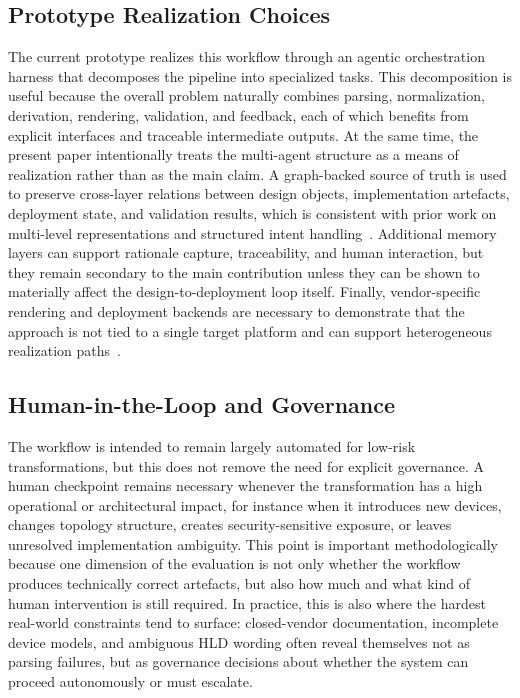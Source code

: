 \documentclass[conference]{IEEEtran}
\begin{document}
\subsection{Prototype Realization Choices}

The current prototype realizes this workflow through an agentic orchestration harness that decomposes the pipeline into specialized tasks. This decomposition is useful because the overall problem naturally combines parsing, normalization, derivation, rendering, validation, and feedback, each of which benefits from explicit interfaces and traceable intermediate outputs. At the same time, the present paper intentionally treats the multi-agent structure as a means of realization rather than as the main claim. A graph-backed source of truth is used to preserve cross-layer relations between design objects, implementation artefacts, deployment state, and validation results, which is consistent with prior work on multi-level representations and structured intent handling~\cite{jeffreyMALT20,paul2025swift}. Additional memory layers can support rationale capture, traceability, and human interaction, but they remain secondary to the main contribution unless they can be shown to materially affect the design-to-deployment loop itself. Finally, vendor-specific rendering and deployment backends are necessary to demonstrate that the approach is not tied to a single target platform and can support heterogeneous realization paths~\cite{enck2007configuration,han2025networkcopilot,cai2026matryoshka}.

\subsection{Human-in-the-Loop and Governance}

The workflow is intended to remain largely automated for low-risk transformations, but this does not remove the need for explicit governance. A human checkpoint remains necessary whenever the transformation has a high operational or architectural impact, for instance when it introduces new devices, changes topology structure, creates security-sensitive exposure, or leaves unresolved implementation ambiguity. This point is important methodologically because one dimension of the evaluation is not only whether the workflow produces technically correct artefacts, but also how much and what kind of human intervention is still required. In practice, this is also where the hardest real-world constraints tend to surface: closed-vendor documentation, incomplete device models, and ambiguous HLD wording often reveal themselves not as parsing failures, but as governance decisions about whether the system can proceed autonomously or must escalate.
\end{document}
